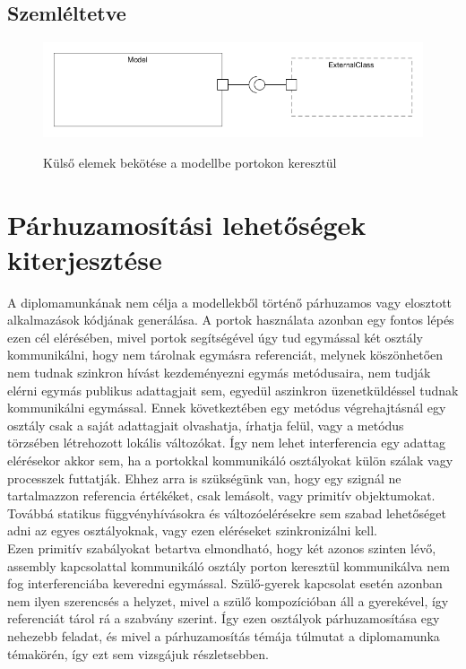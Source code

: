 \documentclass[a4paper,12pt]{report}
\begin{document}
\subsection{Szemléltetve}
\begin{figure}[H]
\begin{center}
\includegraphics[scale=0.6]{external_with_ports.png} \\
\end{center}
\caption{Külső elemek bekötése a modellbe portokon keresztül}
\end{figure}



\section{Párhuzamosítási lehetőségek kiterjesztése}
A diplomamunkának nem célja a modellekből történő párhuzamos vagy elosztott alkalmazások kódjának generálása. A portok használata azonban egy fontos lépés ezen cél elérésében, mivel portok segítségével úgy tud egymással két osztály kommunikálni, hogy nem tárolnak egymásra referenciát, melynek köszönhetően nem tudnak szinkron hívást kezdeményezni egymás metódusaira, nem tudják elérni egymás publikus adattagjait sem, egyedül aszinkron üzenetküldéssel tudnak kommunikálni egymással. Ennek következtében egy metódus végrehajtásnál egy osztály csak a saját adattagjait olvashatja, írhatja felül, vagy a metódus törzsében létrehozott lokális változókat. Így nem lehet interferencia egy adattag elérésekor akkor sem, ha a portokkal kommunikáló osztályokat külön szálak vagy processzek futtatják. Ehhez arra is szükségünk van, hogy egy szignál ne tartalmazzon referencia értékéket, csak lemásolt, vagy primitív objektumokat. Továbbá statikus függvényhívásokra és változóelérésekre sem szabad lehetőséget adni az egyes osztályoknak, vagy ezen eléréseket szinkronizálni kell. \\

Ezen primitív szabályokat betartva elmondható, hogy két azonos szinten lévő, assembly kapcsolattal kommunikáló osztály porton keresztül kommunikálva nem fog interferenciába keveredni egymással. Szülő-gyerek kapcsolat esetén azonban nem ilyen szerencsés a helyzet, mivel a szülő kompozícióban áll a gyerekével, így referenciát tárol rá a szabvány szerint. Így ezen osztályok párhuzamosítása egy nehezebb feladat, és mivel a párhuzamosítás témája túlmutat a diplomamunka témakörén, így ezt sem vizsgájuk részletsebben.
\end{document}
